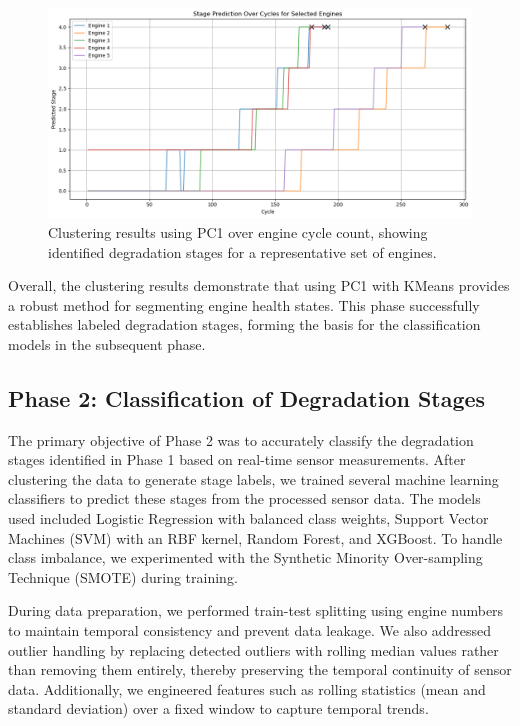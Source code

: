 \documentclass[conference]{IEEEtran}
\begin{document}
\begin{figure}[h]
    \centering
    \includegraphics[width=\linewidth]{clustering_5_engines.png}
    \caption{Clustering results using PC1 over engine cycle count, showing identified degradation stages for a representative set of engines.}
    \label{fig:clustering_results}
\end{figure}

Overall, the clustering results demonstrate that using PC1 with KMeans provides a robust method for segmenting engine health states. This phase successfully establishes labeled degradation stages, forming the basis for the classification models in the subsequent phase.


\subsection{Phase 2: Classification of Degradation Stages}

The primary objective of Phase 2 was to accurately classify the degradation stages identified in Phase 1 based on real-time sensor measurements. After clustering the data to generate stage labels, we trained several machine learning classifiers to predict these stages from the processed sensor data. The models used included Logistic Regression with balanced class weights, Support Vector Machines (SVM) with an RBF kernel, Random Forest, and XGBoost. To handle class imbalance, we experimented with the Synthetic Minority Over-sampling Technique (SMOTE) during training.

During data preparation, we performed train-test splitting using engine numbers to maintain temporal consistency and prevent data leakage. We also addressed outlier handling by replacing detected outliers with rolling median values rather than removing them entirely, thereby preserving the temporal continuity of sensor data. Additionally, we engineered features such as rolling statistics (mean and standard deviation) over a fixed window to capture temporal trends.
\end{document}
